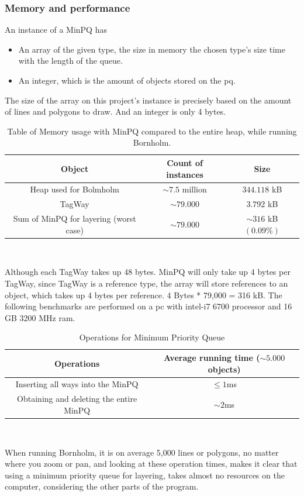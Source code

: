 \subsubsection{Memory and performance}
An instance of a MinPQ has
\begin{itemize}
\setlength{\itemsep}{0.1em}
    \item An array of the given type, the size in memory the chosen type’s size time with the length of the queue.
    \item An integer, which is the amount of objects stored on the pq.
\end{itemize}
The size of the array on this project’s instance is precisely based on the amount of lines and polygons to draw.
And an integer is only 4 bytes.
\begin{table}[ht]
  \centering
  \begin{tabular}{ c|c|c }
   \textbf{Object} & \textbf{Count of instances} & \textbf{Size}\\
   \hline
   Heap used for Bolmholm & $\sim7.5$ million & $344.118$ kB \\
   TagWay & $\sim79.000$ & $3.792$ kB \\
   Sum of MinPQ for layering (worst case) & $\sim79.000$ & $\sim316$ kB $(0.09\%)$ \\
  \end{tabular}\\
  \caption{\centering Table of Memory usage with MinPQ compared to the entire heap, while running Bornholm.
}\label{PQ/memory}
\end{table}
\newline
Although each TagWay takes up 48 bytes. MinPQ will only take up 4 bytes per TagWay, since TagWay is a reference type, the array will store references to an object, which takes up 4 bytes per reference. 4 Bytes * 79,000 = 316 kB.
\newline
The following benchmarks are performed on a pc with intel-i7 6700 processor and 16 GB 3200 MHz ram.
\begin{table}[ht]
  \centering
  \begin{tabular}{ c|c }
   \textbf{Operations} & \textbf{Average running time ($\sim 5.000$ objects})\\
   \hline
    Inserting all ways into the MinPQ & $\leq 1$ms\\
    Obtaining and deleting the entire MinPQ & $\sim 2$ms \\
  \end{tabular}\\
  \caption{\centering Operations for Minimum Priority Queue}\label{PQ/operations}
\end{table}
When running Bornholm, it is on average 5,000 lines or polygons, no matter where you zoom or pan, and looking at these operation times, makes it clear that using a minimum priority queue for layering, takes almost no resources on the computer, considering the other parts of the program.
